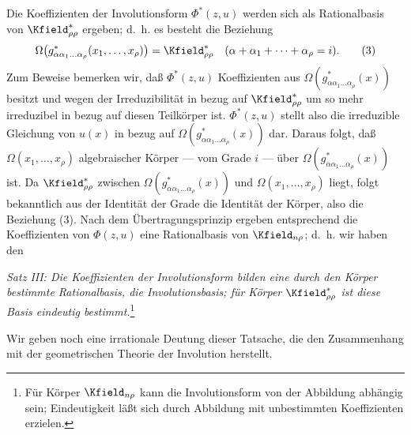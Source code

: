 \documentclass[11pt]{article}
\begin{document}
Die Koeffizienten der Involutionsform $\Phi^*(z,u)$ werden sich als Rationalbasis von $\Kfield^*_{\rho\rho}$ ergeben; d.~h. es besteht die Beziehung
\begin{equation}
  \Omega\bigl(g^*_{\alpha\alpha_1\ldots\alpha_\rho}(x_1,
  \ldots,x_\rho)\bigr)=\Kfield^*_{\rho\rho}
  \quad(\alpha+\alpha_1+\cdots+\alpha_\rho=i).
\tag{3}
\end{equation}
Zum Beweise bemerken wir, daß $\Phi^*(z,u)$ Koeffizienten aus $\Omega(g^*_{\alpha\alpha_1\ldots\alpha_\rho}(x))$ besitzt und wegen der Irreduzibilität in bezug auf $\Kfield^*_{\rho\rho}$ um so mehr irreduzibel in bezug auf diesen Teilkörper ist. $\Phi^*(z,u)$ stellt also die irreduzible Gleichung von $u(x)$ in bezug auf $\Omega(g^*_{\alpha\alpha_1\ldots\alpha_\rho}(x))$ dar. Daraus folgt, daß $\Omega(x_1,
\ldots,x_\rho)$ algebraischer Körper --- vom Grade $i$ --- über $\Omega(g^*_{\alpha\alpha_1\ldots\alpha_\rho}(x))$ ist. Da $\Kfield^*_{\rho\rho}$ zwischen $\Omega(g^*_{\alpha\alpha_1\ldots\alpha_\rho}(x))$ und $\Omega(x_1,
\ldots,x_\rho)$ liegt, folgt bekanntlich aus der Identität der Grade die Identität der Körper, also die Beziehung (3). Nach dem Übertragungsprinzip ergeben entsprechend die Koeffizienten von $\Phi(z,u)$ eine Rationalbasis von $\Kfield_{n\rho}$; d.~h. wir haben den

\emph{Satz III: Die Koeffizienten der Involutionsform bilden eine durch den Körper bestimmte Rationalbasis, die Involutionsbasis; für Körper $\Kfield^*_{\rho\rho}$ ist diese Basis eindeutig bestimmt.}\footnote{Für Körper $\Kfield_{n\rho}$ kann die Involutionsform von der Abbildung abhängig sein; Eindeutigkeit läßt sich durch Abbildung mit unbestimmten Koeffizienten erzielen.}

Wir geben noch eine irrationale Deutung dieser Tatsache, die den Zusammenhang mit der geometrischen Theorie der Involution herstellt.
\end{document}
